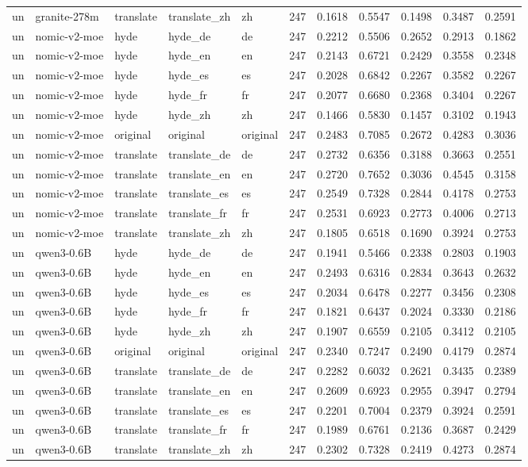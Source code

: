 \begin{tabular}{lllllrrrrrr}
un & granite-278m & translate & translate\_zh & zh & 247 & 0.1618 & 0.5547 & 0.1498 & 0.3487 & 0.2591 \\
un & nomic-v2-moe & hyde & hyde\_de & de & 247 & 0.2212 & 0.5506 & 0.2652 & 0.2913 & 0.1862 \\
un & nomic-v2-moe & hyde & hyde\_en & en & 247 & 0.2143 & 0.6721 & 0.2429 & 0.3558 & 0.2348 \\
un & nomic-v2-moe & hyde & hyde\_es & es & 247 & 0.2028 & 0.6842 & 0.2267 & 0.3582 & 0.2267 \\
un & nomic-v2-moe & hyde & hyde\_fr & fr & 247 & 0.2077 & 0.6680 & 0.2368 & 0.3404 & 0.2267 \\
un & nomic-v2-moe & hyde & hyde\_zh & zh & 247 & 0.1466 & 0.5830 & 0.1457 & 0.3102 & 0.1943 \\
un & nomic-v2-moe & original & original & original & 247 & 0.2483 & 0.7085 & 0.2672 & 0.4283 & 0.3036 \\
un & nomic-v2-moe & translate & translate\_de & de & 247 & 0.2732 & 0.6356 & 0.3188 & 0.3663 & 0.2551 \\
un & nomic-v2-moe & translate & translate\_en & en & 247 & 0.2720 & 0.7652 & 0.3036 & 0.4545 & 0.3158 \\
un & nomic-v2-moe & translate & translate\_es & es & 247 & 0.2549 & 0.7328 & 0.2844 & 0.4178 & 0.2753 \\
un & nomic-v2-moe & translate & translate\_fr & fr & 247 & 0.2531 & 0.6923 & 0.2773 & 0.4006 & 0.2713 \\
un & nomic-v2-moe & translate & translate\_zh & zh & 247 & 0.1805 & 0.6518 & 0.1690 & 0.3924 & 0.2753 \\
un & qwen3-0.6B & hyde & hyde\_de & de & 247 & 0.1941 & 0.5466 & 0.2338 & 0.2803 & 0.1903 \\
un & qwen3-0.6B & hyde & hyde\_en & en & 247 & 0.2493 & 0.6316 & 0.2834 & 0.3643 & 0.2632 \\
un & qwen3-0.6B & hyde & hyde\_es & es & 247 & 0.2034 & 0.6478 & 0.2277 & 0.3456 & 0.2308 \\
un & qwen3-0.6B & hyde & hyde\_fr & fr & 247 & 0.1821 & 0.6437 & 0.2024 & 0.3330 & 0.2186 \\
un & qwen3-0.6B & hyde & hyde\_zh & zh & 247 & 0.1907 & 0.6559 & 0.2105 & 0.3412 & 0.2105 \\
un & qwen3-0.6B & original & original & original & 247 & 0.2340 & 0.7247 & 0.2490 & 0.4179 & 0.2874 \\
un & qwen3-0.6B & translate & translate\_de & de & 247 & 0.2282 & 0.6032 & 0.2621 & 0.3435 & 0.2389 \\
un & qwen3-0.6B & translate & translate\_en & en & 247 & 0.2609 & 0.6923 & 0.2955 & 0.3947 & 0.2794 \\
un & qwen3-0.6B & translate & translate\_es & es & 247 & 0.2201 & 0.7004 & 0.2379 & 0.3924 & 0.2591 \\
un & qwen3-0.6B & translate & translate\_fr & fr & 247 & 0.1989 & 0.6761 & 0.2136 & 0.3687 & 0.2429 \\
un & qwen3-0.6B & translate & translate\_zh & zh & 247 & 0.2302 & 0.7328 & 0.2419 & 0.4273 & 0.2874 \\
\bottomrule
\end{tabular}
